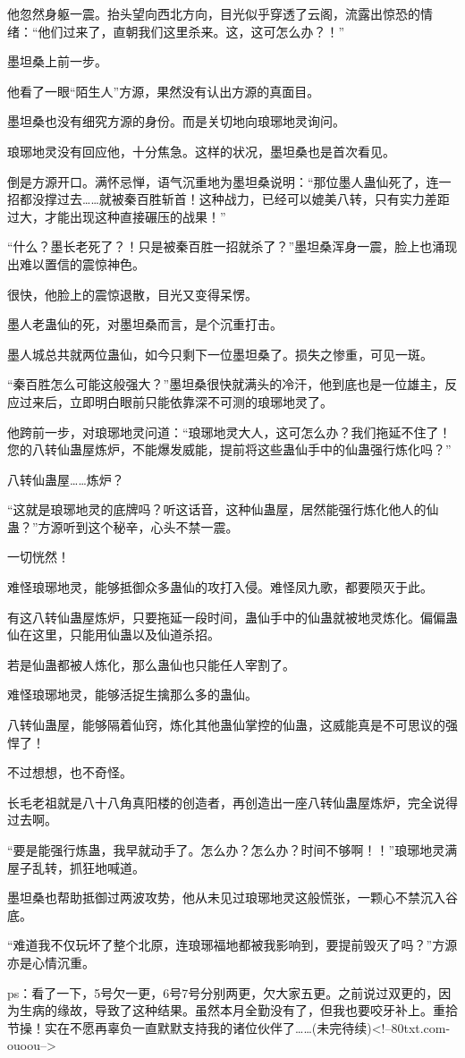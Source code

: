 \begin{this_body}
他忽然身躯一震。抬头望向西北方向，目光似乎穿透了云阁，流露出惊恐的情绪：“他们过来了，直朝我们这里杀来。这，这可怎么办？！”

墨坦桑上前一步。

他看了一眼“陌生人”方源，果然没有认出方源的真面目。

墨坦桑也没有细究方源的身份。而是关切地向琅琊地灵询问。

琅琊地灵没有回应他，十分焦急。这样的状况，墨坦桑也是首次看见。

倒是方源开口。满怀忌惮，语气沉重地为墨坦桑说明：“那位墨人蛊仙死了，连一招都没撑过去……就被秦百胜斩首！这种战力，已经可以媲美八转，只有实力差距过大，才能出现这种直接碾压的战果！”

“什么？墨长老死了？！只是被秦百胜一招就杀了？”墨坦桑浑身一震，脸上也涌现出难以置信的震惊神色。

很快，他脸上的震惊退散，目光又变得呆愣。

墨人老蛊仙的死，对墨坦桑而言，是个沉重打击。

墨人城总共就两位蛊仙，如今只剩下一位墨坦桑了。损失之惨重，可见一斑。

“秦百胜怎么可能这般强大？”墨坦桑很快就满头的冷汗，他到底也是一位雄主，反应过来后，立即明白眼前只能依靠深不可测的琅琊地灵了。

他跨前一步，对琅琊地灵问道：“琅琊地灵大人，这可怎么办？我们拖延不住了！您的八转仙蛊屋炼炉，不能爆发威能，提前将这些蛊仙手中的仙蛊强行炼化吗？”

八转仙蛊屋……炼炉？

“这就是琅琊地灵的底牌吗？听这话音，这种仙蛊屋，居然能强行炼化他人的仙蛊？”方源听到这个秘辛，心头不禁一震。

一切恍然！

难怪琅琊地灵，能够抵御众多蛊仙的攻打入侵。难怪凤九歌，都要陨灭于此。

有这八转仙蛊屋炼炉，只要拖延一段时间，蛊仙手中的仙蛊就被地灵炼化。偏偏蛊仙在这里，只能用仙蛊以及仙道杀招。

若是仙蛊都被人炼化，那么蛊仙也只能任人宰割了。

难怪琅琊地灵，能够活捉生擒那么多的蛊仙。

八转仙蛊屋，能够隔着仙窍，炼化其他蛊仙掌控的仙蛊，这威能真是不可思议的强悍了！

不过想想，也不奇怪。

长毛老祖就是八十八角真阳楼的创造者，再创造出一座八转仙蛊屋炼炉，完全说得过去啊。

“要是能强行炼蛊，我早就动手了。怎么办？怎么办？时间不够啊！！”琅琊地灵满屋子乱转，抓狂地喊道。

墨坦桑也帮助抵御过两波攻势，他从未见过琅琊地灵这般慌张，一颗心不禁沉入谷底。

“难道我不仅玩坏了整个北原，连琅琊福地都被我影响到，要提前毁灭了吗？”方源亦是心情沉重。

ps：看了一下，5号欠一更，6号7号分别两更，欠大家五更。之前说过双更的，因为生病的缘故，导致了这种结果。虽然本月全勤没有了，但我也要咬牙补上。重拾节操！实在不愿再辜负一直默默支持我的诸位伙伴了……(未完待续)<!--80txt.com-ouoou-->

\end{this_body}

